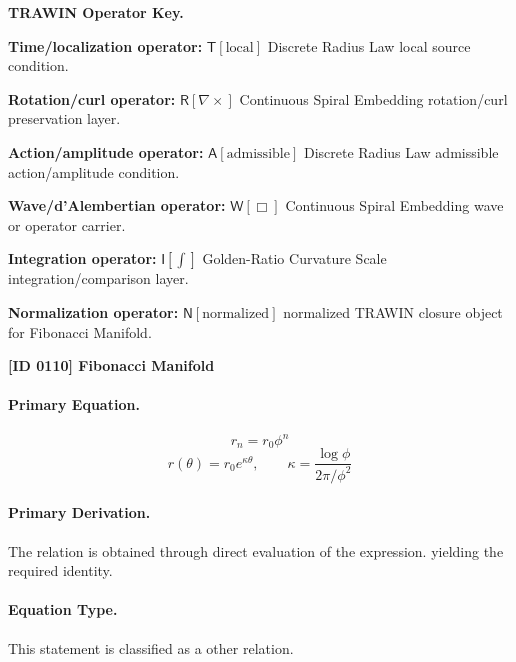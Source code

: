 \par\vspace{0.45\baselineskip}
\noindent\begin{minipage}[t]{\linewidth}
\begingroup
\small
\raggedright
\textbf{TRAWIN Operator Key.}\par
\noindent\textbf{Time/localization operator:} $\mathsf{T}\!\left[\mathrm{local}\right]$ Discrete Radius Law local source condition.\par
\noindent\textbf{Rotation/curl operator:} $\mathsf{R}\!\left[\nabla\times\right]$ Continuous Spiral Embedding rotation/curl preservation layer.\par
\noindent\textbf{Action/amplitude operator:} $\mathsf{A}\!\left[\mathrm{admissible}\right]$ Discrete Radius Law admissible action/amplitude condition.\par
\noindent\textbf{Wave/d'Alembertian operator:} $\mathsf{W}\!\left[\Box\right]$ Continuous Spiral Embedding wave or operator carrier.\par
\noindent\textbf{Integration operator:} $\mathsf{I}\!\left[\int\right]$ Golden-Ratio Curvature Scale integration/comparison layer.\par
\noindent\textbf{Normalization operator:} $\mathsf{N}\!\left[\mathrm{normalized}\right]$ normalized TRAWIN closure object for Fibonacci Manifold.\par
\endgroup
\end{minipage}

\clearpage
\noindent\textbf{[ID 0110] Fibonacci Manifold}\par
\vspace{0.35em}
\paragraph{Primary Equation.}
\[
r_n = r_0 \phi^n
\]
\[
r(\theta)= r_0 e^{\kappa \theta},
\qquad
\kappa = \frac{\log \phi}{2\pi/\phi^2}
\]

\paragraph{Primary Derivation.}
The relation is obtained through direct evaluation of the expression. yielding the required identity.
\paragraph{Equation Type.}
This statement is classified as a other relation.

